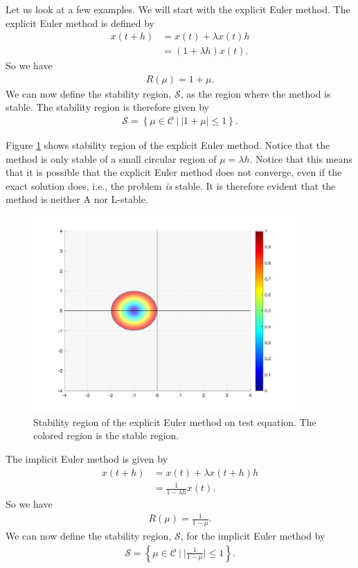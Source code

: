 Let us look at a few examples. We will start with the explicit Euler method. The explicit Euler method is defined by 
\begin{align}
    x(t+h) &= x(t) + \lambda x(t) h \\
    &= (1+\lambda h) x(t).
\end{align}
So we have 
\begin{align}
    R(\mu) = 1 + \mu.
\end{align}
We can now define the stability region, $\mathcal{S}$, as the region where the method is stable. The stability region is therefore given by
\begin{align}
    \mathcal{S} = \left \{ \mu \in \mathcal{C} \ | \ |1+\mu| \leq 1 \right \}.
\end{align}

Figure \ref{fig1:ex_stability} shows stability region of the explicit Euler method. Notice that the method is only stable of a small circular region of $\mu=\lambda h$. Notice that this means that it is possible that the explicit Euler method does not converge, even if the exact solution does, i.e., the problem \textit{is} stable. It is therefore evident that the method is neither A nor L-stable.

\begin{figure}[H]
    \centering
    \includegraphics[width=10cm]{graphics/opg1/ex_stability.png}
    \caption{Stability region of the explicit Euler method on test equation. The colored region is the stable region.}
    \label{fig1:ex_stability}
\end{figure}


The implicit Euler method is given by
\begin{align}
    x(t+h) &= x(t) + \lambda x(t+h) h \\
    &= \frac{1}{1-\lambda h} x(t).
\end{align}
So we have 
\begin{align}
    R(\mu) = \frac{1}{1-\mu}.
\end{align}
We can now define the stability region, $\mathcal{S}$, for the implicit Euler method by
\begin{align}
    \mathcal{S} = \left \{ \mu \in \mathcal{C} \ | \ |\frac{1}{1-\mu}| \leq 1 \right \}.
\end{align}

